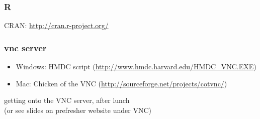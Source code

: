\documentclass[]{beamer}
\begin{document}
\begin{frame}
\frametitle{R}
\pause
\begin{center}
CRAN: \url{http://cran.r-project.org/}
\end{center}
\end{frame}

\begin{frame}
\frametitle{vnc server}
\pause
\begin{itemize}
\item Windows: HMDC script (\url{http://www.hmdc.harvard.edu/HMDC_VNC.EXE})
\pause
\bigskip
\item Mac: Chicken of the VNC (\url{http://sourceforge.net/projects/cotvnc/})
\end{itemize}
\end{frame}

\begin{frame}
\begin{center}
getting onto the VNC server, after lunch\\
 \pause (or see slides on prefresher website under VNC)
\end{center}
\end{frame}
\end{document}
